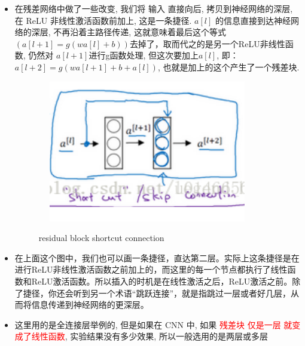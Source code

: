 \documentclass[12pt]{ctexart}%
\begin{document}
\begin{itemize}
				\item 在残差网络中做了一些改变, 我们将 输入 直接向后, 拷贝到神经网络的深层, 在 ReLU 非线性激活函数前加上, 这是一条捷径. $a[l]$ 的信息直接到达神经网络的深层, 不再沿着主路径传递, 这就意味着最后这个等式$(a[l+1]=g(wa[l]+b))$去掉了，取而代之的是另一个ReLU非线性函数, 仍然对 $a[l+1]$进行g函数处理, 但这次要加上$a[l]$, 即：$a[l+2]=g(wa[l+1]+b+a[l])$, 也就是加上的这个产生了一个残差块. 
						\begin{figure}[H]
							\vspace{-0.2cm}  %
							\setlength{\abovecaptionskip}{-0.2cm}   %
							\centering
							\includegraphics[scale=1]{residual_block_shortcut_connection.png}
							\renewcommand{\figurename}{Fig} %
							\caption{residual block shortcut connection}
							\label{fig7:residual block shortcut connection}
						\end{figure}
			
				\item 在上面这个图中，我们也可以画一条捷径，直达第二层。实际上这条捷径是在进行ReLU非线性激活函数之前加上的，而这里的每一个节点都执行了线性函数和ReLU激活函数。所以插入的时机是在线性激活之后，ReLU激活之前。除了捷径，你还会听到另一个术语“跳跃连接”，就是指跳过一层或者好几层，从而将信息传递到神经网络的更深层。
				
				\item 这里用的是全连接层举例的, 但是如果在 CNN 中, 如果 \textcolor{red}{残差块 仅是一层 就变成了线性函数}, 实验结果没有多少效果, 所以一般选用的是两层或多层
			\end{itemize}
			
\end{document}
